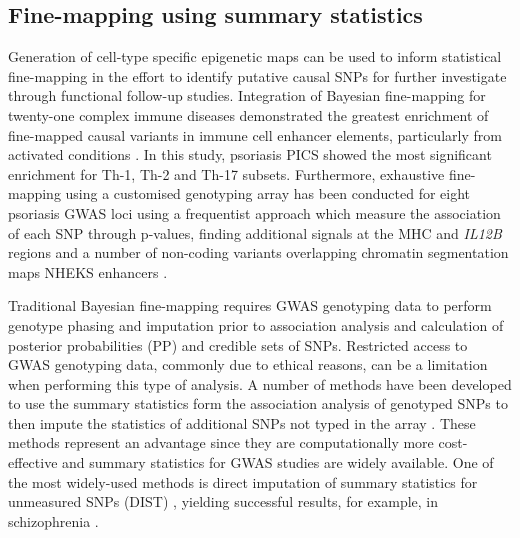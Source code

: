 \subsection{Fine-mapping using summary statistics}

Generation of cell-type specific epigenetic maps can be used to inform statistical fine-mapping in the effort to identify putative causal SNPs for further investigate through functional follow-up studies. Integration of Bayesian fine-mapping for twenty-one complex immune diseases demonstrated the greatest enrichment of fine-mapped causal variants in immune cell enhancer elements, particularly from activated conditions \parencite{Farh2015}. In this study, psoriasis PICS showed the most significant enrichment for Th-1, Th-2 and Th-17 subsets. Furthermore, exhaustive fine-mapping using a customised genotyping array has been conducted for eight psoriasis GWAS loci using a frequentist approach which measure the association of each SNP through p-values, finding additional signals at the MHC and  \textit{IL12B} regions and a number of non-coding variants overlapping chromatin segmentation maps NHEKS enhancers \parencite{Das2014}.

Traditional Bayesian fine-mapping requires GWAS genotyping data to perform genotype phasing and imputation prior to association analysis and calculation of posterior probabilities (PP) and credible sets of SNPs. Restricted access to GWAS genotyping data, commonly due to ethical reasons, can be a limitation when performing this type of analysis. A number of methods have been developed to use the summary statistics form the association analysis of genotyped SNPs to then impute the statistics of additional SNPs not typed in the array \parencite{Pasaniuc2017}. These methods represent an advantage since they are computationally more cost-effective and summary statistics for GWAS studies are widely available. One of the most widely-used methods is direct imputation of summary statistics for unmeasured SNPs (DIST) \parencite{Lee2013}, yielding successful results, for example, in schizophrenia \parencite{Edwards2015}. %

